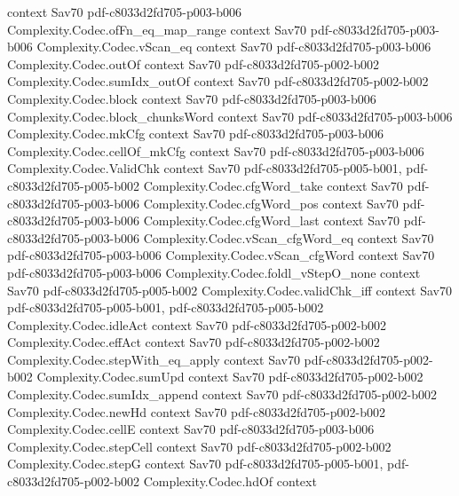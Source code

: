 \begin{theorem}
  {context}
  {Sav70}
  {pdf-c8033d2fd705-p003-b006}
\proofstep
  {Complexity.Codec.ofFn_eq_map_range}
  {context}
  {Sav70}
  {pdf-c8033d2fd705-p003-b006}
\proofstep
  {Complexity.Codec.vScan_eq}
  {context}
  {Sav70}
  {pdf-c8033d2fd705-p003-b006}
\proofstep
  {Complexity.Codec.outOf}
  {context}
  {Sav70}
  {pdf-c8033d2fd705-p002-b002}
\proofstep
  {Complexity.Codec.sumIdx_outOf}
  {context}
  {Sav70}
  {pdf-c8033d2fd705-p002-b002}
\proofstep
  {Complexity.Codec.block}
  {context}
  {Sav70}
  {pdf-c8033d2fd705-p003-b006}
\proofstep
  {Complexity.Codec.block_chunksWord}
  {context}
  {Sav70}
  {pdf-c8033d2fd705-p003-b006}
\proofstep
  {Complexity.Codec.mkCfg}
  {context}
  {Sav70}
  {pdf-c8033d2fd705-p003-b006}
\proofstep
  {Complexity.Codec.cellOf_mkCfg}
  {context}
  {Sav70}
  {pdf-c8033d2fd705-p003-b006}
\proofstep
  {Complexity.Codec.ValidChk}
  {context}
  {Sav70}
  {pdf-c8033d2fd705-p005-b001,
    pdf-c8033d2fd705-p005-b002}
\proofstep
  {Complexity.Codec.cfgWord_take}
  {context}
  {Sav70}
  {pdf-c8033d2fd705-p003-b006}
\proofstep
  {Complexity.Codec.cfgWord_pos}
  {context}
  {Sav70}
  {pdf-c8033d2fd705-p003-b006}
\proofstep
  {Complexity.Codec.cfgWord_last}
  {context}
  {Sav70}
  {pdf-c8033d2fd705-p003-b006}
\proofstep
  {Complexity.Codec.vScan_cfgWord_eq}
  {context}
  {Sav70}
  {pdf-c8033d2fd705-p003-b006}
\proofstep
  {Complexity.Codec.vScan_cfgWord}
  {context}
  {Sav70}
  {pdf-c8033d2fd705-p003-b006}
\proofstep
  {Complexity.Codec.foldl_vStepO_none}
  {context}
  {Sav70}
  {pdf-c8033d2fd705-p005-b002}
\proofstep
  {Complexity.Codec.validChk_iff}
  {context}
  {Sav70}
  {pdf-c8033d2fd705-p005-b001,
    pdf-c8033d2fd705-p005-b002}
\proofstep
  {Complexity.Codec.idleAct}
  {context}
  {Sav70}
  {pdf-c8033d2fd705-p002-b002}
\proofstep
  {Complexity.Codec.effAct}
  {context}
  {Sav70}
  {pdf-c8033d2fd705-p002-b002}
\proofstep
  {Complexity.Codec.stepWith_eq_apply}
  {context}
  {Sav70}
  {pdf-c8033d2fd705-p002-b002}
\proofstep
  {Complexity.Codec.sumUpd}
  {context}
  {Sav70}
  {pdf-c8033d2fd705-p002-b002}
\proofstep
  {Complexity.Codec.sumIdx_append}
  {context}
  {Sav70}
  {pdf-c8033d2fd705-p002-b002}
\proofstep
  {Complexity.Codec.newHd}
  {context}
  {Sav70}
  {pdf-c8033d2fd705-p002-b002}
\proofstep
  {Complexity.Codec.cellE}
  {context}
  {Sav70}
  {pdf-c8033d2fd705-p003-b006}
\proofstep
  {Complexity.Codec.stepCell}
  {context}
  {Sav70}
  {pdf-c8033d2fd705-p002-b002}
\proofstep
  {Complexity.Codec.stepG}
  {context}
  {Sav70}
  {pdf-c8033d2fd705-p005-b001,
    pdf-c8033d2fd705-p002-b002}
\proofstep
  {Complexity.Codec.hdOf}
  {context}

\end{theorem}
